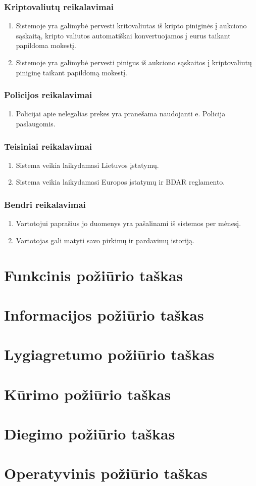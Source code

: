 \documentclass{VUMIFPSmagistrinis}
\begin{document}
				\subsubsection{Kriptovaliutų reikalavimai}
					\begin{enumerate}
						\item{Sistemoje yra galimybė pervesti kritovaliutas iš kripto piniginės į aukciono sąskaitą, kripto valiutos automatiškai konvertuojamos į eurus taikant papildoma mokestį. }
						\item{Sistemoje yra galimybė pervesti pinigus iš aukciono sąskaitos į kriptovaliutų piniginę taikant papildomą mokestį.}
					\end{enumerate}
				\subsubsection{Policijos reikalavimai}
					\begin{enumerate}
						\item{Policijai apie nelegalias prekes yra pranešama naudojanti e. Policija paslaugomis.}
					\end{enumerate}
				\subsubsection{Teisiniai reikalavimai}
					\begin{enumerate}
						\item{Sistema veikia laikydamasi Lietuvos įstatymų.}
						\item{Sistema veikia laikydamasi Europos įstatymų ir BDAR reglamento.}
					\end{enumerate}
				\subsubsection{Bendri reikalavimai}
					\begin{enumerate}
						\item{Vartotojui paprašius jo duomenys yra pašalinami iš sistemos per mėnesį.}
						\item{Vartotojas gali matyti savo pirkimų ir pardavimų istoriją.}	
					\end{enumerate}
			
		\section{Funkcinis požiūrio taškas}
		\section{Informacijos požiūrio taškas}
		\section{Lygiagretumo požiūrio taškas}
		\section{Kūrimo požiūrio taškas}
		\section{Diegimo požiūrio taškas}
		\section{Operatyvinis požiūrio taškas}
		
\end{document}
